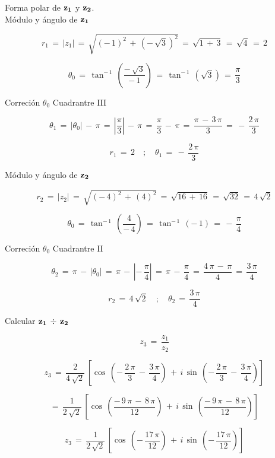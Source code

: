\documentclass[a4paper,11pt,openany]{book}
\begin{document}
\textcolor{ao(english)}{} Forma polar de $\bf{z_{1}}$ y $\bf{z_{2}}$.\\

\textcolor{ao(english)}{} Módulo y ángulo de $\bf{z_{1}}$ 

$$r_{1}\,=\,|z_{1}|\,=\,\sqrt{(-\,1)^{2}\,+\,(-\,\sqrt{3})^{2}}\,=\,\sqrt{1\,+\,3}\,=\,\sqrt{4}\,=\,2$$

$$\theta_{0}\,=\,\tan^{-\,1}\,\left(\dfrac{-\,\sqrt{3}}{-\,1}\right)\,=\,\tan^{-\,1}\,(\sqrt{3})\,=\,\dfrac{\pi}{3}$$

\newpage

\textcolor{ao(english)}{} Correción $\theta_{0}$ Cuadrantre III

$$\theta_{1}\,=\,|\theta_{0}|\,-\,\pi\,=\,\left|\dfrac{\pi}{3}\right|\,-\,\pi\,=\,\dfrac{\pi}{3}\,-\,\pi\,=\,\dfrac{\pi\,-\,3\,\pi}{3}\,=\,-\,\dfrac{2\,\pi}{3}$$

$$\boxed{r_{1}\,=\,2 \quad;\quad \theta_{1}\,=\,-\,\dfrac{2\,\pi}{3}}$$

\textcolor{ao(english)}{} Módulo y ángulo de $\bf{z_{2}}$ 

$$r_{2}\,=\,|z_{2}|\,=\,\sqrt{(-\,4)^{2}\,+\,(4)^{2}}\,=\,\sqrt{16\,+\,16}\,=\,\sqrt{32}\,=\,4\,\sqrt{2}$$

$$\theta_{0}\,=\,\tan^{-\,1}\,\left(\dfrac{4}{-\,4}\right)\,=\,\tan^{-\,1}\,(-\,1)\,=\,-\,\dfrac{\pi}{4}$$

\textcolor{ao(english)}{} Correción $\theta_{0}$ Cuadrantre II

$$\theta_{2}\,=\,\pi\,-\,|\theta_{0}|\,=\,\pi\,-\,\left|-\,\dfrac{\pi}{4}\right|\,=\,\pi\,-\,\dfrac{\pi}{4}\,=\,\dfrac{4\,\pi\,-\,\pi}{4}\,=\,\dfrac{3\,\pi}{4}$$

$$\boxed{r_{2}\,=\,4\,\sqrt{2} \quad;\quad \theta_{2}\,=\,\dfrac{3\,\pi}{4}}$$

\textcolor{ao(english)}{} Calcular $\bf{z_{1}\,\div\,z_{2}}$

$$z_{3}\,=\,\dfrac{z_{1}}{z_{2}}$$

$$z_{3}\,=\,\dfrac{2}{4\,\sqrt{2}}\,\left[\cos\,\left(-\,\dfrac{2\,\pi}{3}\,-\,\dfrac{3\,\pi}{4}\right)\,+\,i\,\sin\,\left(-\,\dfrac{2\,\pi}{3}\,-\,\dfrac{3\,\pi}{4}\right)\right]$$

$$=\,\dfrac{1}{2\,\sqrt{2}}\,\left[\cos\,\left(\dfrac{-\,9\,\pi\,-\,8\,\pi}{12}\right)\,+\,i\,\sin\,\left(\dfrac{-\,9\,\pi\,-\,8\,\pi}{12}\right)\right]$$

$$z_{3}\,=\,\dfrac{1}{2\,\sqrt{2}}\,\left[\cos\,\left(-\,\dfrac{17\,\pi}{12}\right)\,+\,i\,\sin\,\left(-\,\dfrac{17\,\pi}{12}\right)\right]$$
\end{document}
